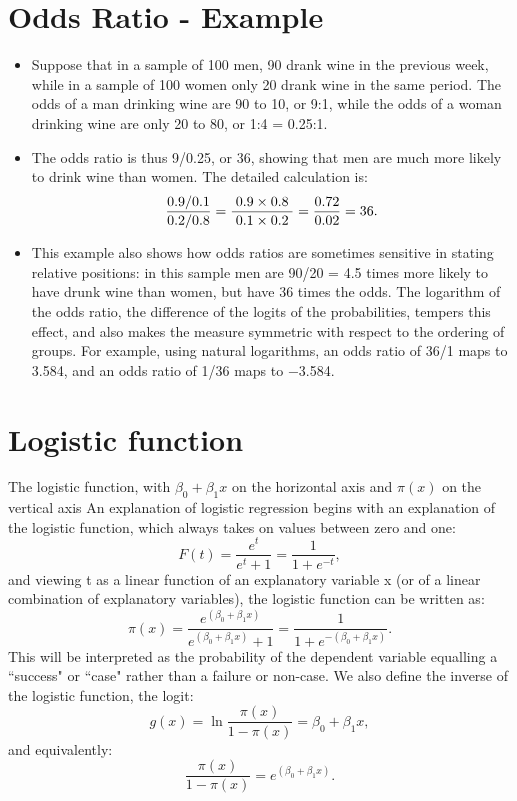 \documentclass[12pt]{article}
\begin{document}
\section*{Odds Ratio - Example}
\begin{itemize}
	\item Suppose that in a sample of 100 men, 90 drank wine in the previous week, while in a sample of 100 women only 20 drank wine in the same period. The odds of a man drinking wine are 90 to 10, or 9:1, while the odds of a woman drinking wine are only 20 to 80, or 1:4 = 0.25:1. 
	\item The odds ratio is thus 9/0.25, or 36, showing that men are much more likely to drink wine than women. The detailed calculation is:
	\[{ 0.9/0.1 \over 0.2/0.8}=\frac{\;0.9\times 0.8\;}{\;0.1\times 0.2\;} ={0.72 \over 0.02} = 36.\]
	\item This example also shows how odds ratios are sometimes sensitive in stating relative positions: in this sample men are 90/20 = 4.5 times more likely to have drunk wine than women, but have 36 times the odds. The logarithm of the odds ratio, the difference of the logits of the probabilities, tempers this effect, and also makes the measure symmetric with respect to the ordering of groups. For example, using natural logarithms, an odds ratio of 36/1 maps to 3.584, and an odds ratio of 1/36 maps to −3.584.
\end{itemize}

\newpage

\section*{Logistic function} 

The logistic function, with $\beta_0 + \beta_1 x$ on the horizontal axis and $\pi(x)$ on the vertical axis
An explanation of logistic regression begins with an explanation of the logistic function, which always takes on values between zero and one:
\[
F(t) = \frac{e^t}{e^t+1} = \frac{1}{1+e^{-t}},
\]
and viewing t as a linear function of an explanatory variable x (or of a linear combination of explanatory variables), the logistic function can be written as:
\[\pi(x) = \frac{e^{(\beta_0 + \beta_1 x)}} {e^{(\beta_0 + \beta_1 x)} + 1} = \frac {1} {1+e^{-(\beta_0 + \beta_1 x)}}.
\]
This will be interpreted as the probability of the dependent variable equalling a ``success" or ``case" rather than a failure or non-case. We also define the inverse of the logistic function, the logit:
\[g(x) = \ln \frac {\pi(x)} {1 - \pi(x)} = \beta_0 + \beta_1 x ,
\]and equivalently:
\[\frac{\pi(x)} {1 - \pi(x)} = e^{(\beta_0 + \beta_1 x)}.
\]
\end{document}
